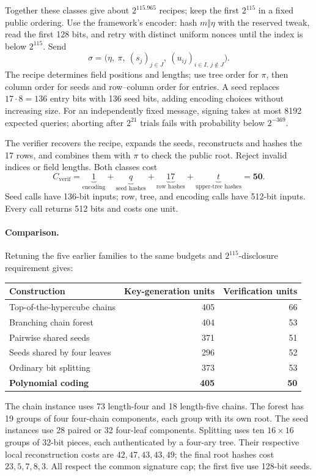 \documentclass[10pt]{article}
\begin{document}
Together these classes give about $2^{115.965}$ recipes; keep the first $2^{115}$ in a fixed public ordering. Use the framework's encoder: hash $m\Vert\eta$ with the reserved tweak, read the first 128 bits, and retry with distinct uniform nonces until the index is below $2^{115}$. Send
\[
 \sigma=\bigl(\eta,\ \pi,\ (s_j)_{j\in J},\ (u_{ij})_{i\in I,\ j\notin J}\bigr).
\]
The recipe determines field positions and lengths; use tree order for $\pi$, then column order for seeds and row--column order for entries. A seed replaces $17\cdot8=136$ entry bits with 136 seed bits, adding encoding choices without increasing size. For an independently fixed message, signing takes at most 8192 expected queries; aborting after $2^{21}$ trials fails with probability below $2^{-369}$.

The verifier recovers the recipe, expands the seeds, reconstructs and hashes the 17 rows, and combines them with $\pi$ to check the public root. Reject invalid indices or field lengths. Both classes cost
\[
 C_{\mathrm{verif}}=\underbrace{1}_{\text{encoding}}+\underbrace{q}_{\text{seed hashes}}+\underbrace{17}_{\text{row hashes}}+\underbrace{t}_{\text{upper-tree hashes}}=\mathbf{50}.
\]
Seed calls have 136-bit inputs; row, tree, and encoding calls have 512-bit inputs. Every call returns 512 bits and costs one unit.

\paragraph{Comparison.} Retuning the five earlier families to the same budgets and $2^{115}$-disclosure requirement gives:
\begin{center}
\begin{tabular}{lrr}
Construction & Key-generation units & Verification units\\
\hline
Top-of-the-hypercube chains & 405 & 66\\
Branching chain forest & 404 & 53\\
Pairwise shared seeds & 371 & 51\\
Seeds shared by four leaves & 296 & 52\\
Ordinary bit splitting & 373 & 53\\
\textbf{Polynomial coding} & \textbf{405} & \textbf{50}
\end{tabular}
\end{center}
The chain instance uses 73 length-four and 18 length-five chains. The forest has 19 groups of four four-chain components, each group with its own root. The seed instances use 28 paired or 32 four-leaf components. Splitting uses ten $16\times16$ groups of 32-bit pieces, each authenticated by a four-ary tree. Their respective local reconstruction costs are $42,47,43,43,49$; the final root hashes cost $23,5,7,8,3$. All respect the common signature cap; the first five use 128-bit seeds.
\end{document}
